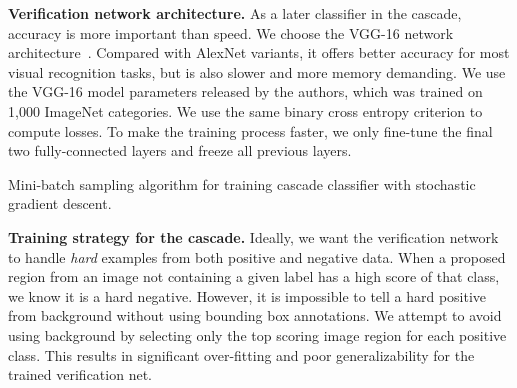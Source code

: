 \documentclass[10pt,twocolumn,letterpaper]{article}
\begin{document}
\textbf{Verification network architecture.} As a later classifier in the cascade, accuracy is more important than speed. We choose the VGG-16 network architecture~\cite{Simonyan14c}. Compared with AlexNet variants, it offers better accuracy for most visual recognition tasks, but is also slower and more memory demanding. We use the VGG-16 model parameters released by the authors, which was trained on 1,000 ImageNet categories. We use the same binary cross entropy criterion to compute losses. To make the training process faster, we only fine-tune the final two fully-connected layers and freeze all previous layers.

\begin{algorithm}
\caption{Mini-batch sampling algorithm for training cascade classifier with stochastic gradient descent.}
\label{alg:sample}
\end{algorithm}

\textbf{Training strategy for the cascade.} Ideally, we want the verification network to handle \textit{hard} examples from both positive and negative data. When a proposed region from an image not containing a given label has a high score of that class, we know it is a hard negative. However, it is impossible to tell a hard positive from background without using bounding box annotations. We attempt to avoid using background by selecting only the top scoring image region for each positive class. This results in significant over-fitting and poor generalizability for the trained verification net. 
\end{document}
